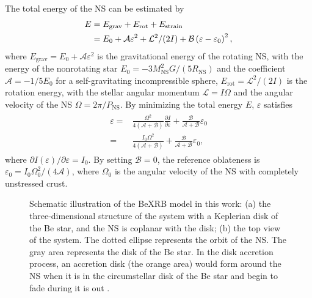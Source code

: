 \documentclass[twocolumn]{aastex62}
\begin{document}
The total energy of the NS can be estimated by \citep{bay71, shap86}
\begin{align}
E &=E_{\text{grav}} + E_{\text{rot}} + E_{\text{strain}}   \notag \\ &=E_{0}+\mathcal{A} \varepsilon^{2}+\mathcal{L}^{2} /(2 I)+\mathcal{B}\left(\varepsilon-\varepsilon_{0}\right)^{2},
\end{align}
where $E_{\text{grav}} = E_{0} + \mathcal{A} \varepsilon^{2}$ is the gravitational energy of the rotating NS, with the energy of the nonrotating star $E_{0} = -3M_{\text{NS}}^2G/(5R_{\text{NS}})$ and the coefficient $ \mathcal{A} = -1/5 E_{0} $ for a self-gravitating incompressible sphere, $E_{\text{rot}} = \mathcal{L}^{2} /(2 I)$ is the rotation energy, with the stellar angular momentum $\mathcal{L} = I \Omega$ and the angular velocity of the NS $ \Omega = 2\pi/P_{\text{NS}}$.
By minimizing the total energy $E$, $\varepsilon$ satisfies
\begin{eqnarray}
\begin{aligned} \varepsilon=&\frac{\Omega^{2}}{4(\mathcal{A}+\mathcal{B})} \frac{\partial I}{\partial \varepsilon}+\frac{\mathcal{B}}{\mathcal{A}+\mathcal{B}} \varepsilon_{0} \\  = & \frac{I_{0} \Omega^{2}}{4(\mathcal{A}+\mathcal{B})}+\frac{\mathcal{B}}{\mathcal{A}+\mathcal{B}} \varepsilon_{0},
\label{epsilon}
\end{aligned}
\end{eqnarray}
where $\partial I(\varepsilon) / \partial \varepsilon=I_{0}$.
By setting $\mathcal{B} = 0$, the reference oblateness is
$\varepsilon_{0}=I_{0} \Omega_{0}^{2} /(4 \mathcal{A})$,
where $\Omega_{0}$ is the angular velocity of the NS with completely unstressed crust.

\begin{figure}[]
\centering
{}
\caption{Schematic illustration of the BeXRB model in this work:
(a) the three-dimensional structure of the system with a Keplerian disk of the Be star, and the NS is coplanar with the disk;
(b) the top view of the system. The dotted ellipse represents the orbit of the NS.
The gray area represents the disk of the Be star.
In the disk accretion process, an accretion disk (the orange area) would form around the NS when it is in the circumstellar disk of the Be star and begin to fade during it is out \citep[e.g.,][]{oka01}.
 }
\label{model orbit}
\end{figure}
\end{document}
